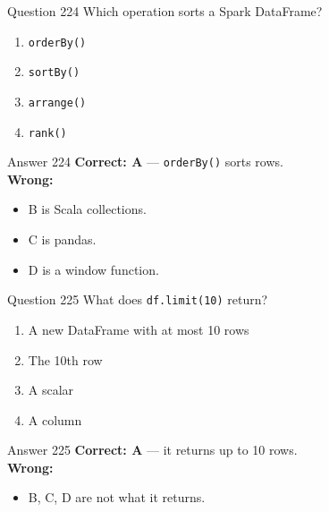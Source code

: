 \documentclass[aspectratio=169,11pt]{beamer}
\begin{document}
	\begin{frame}{Question 224}
		Which operation sorts a Spark DataFrame?
		\begin{enumerate}[label=\Alph*.]
			\item \texttt{orderBy()}
			\item \texttt{sortBy()}
			\item \texttt{arrange()}
			\item \texttt{rank()}
		\end{enumerate}
	\end{frame}
	\begin{frame}{Answer 224}
		\textbf{Correct: A} --- \texttt{orderBy()} sorts rows.\\
		\vspace{0.5em}
		\textbf{Wrong:}
		\begin{itemize}
			\item B is Scala collections.
			\item C is pandas.
			\item D is a window function.
		\end{itemize}
	\end{frame}
	
	\begin{frame}{Question 225}
		What does \texttt{df.limit(10)} return?
		\begin{enumerate}[label=\Alph*.]
			\item A new DataFrame with at most 10 rows
			\item The 10th row
			\item A scalar
			\item A column
		\end{enumerate}
	\end{frame}
	\begin{frame}{Answer 225}
		\textbf{Correct: A} --- it returns up to 10 rows.\\
		\vspace{0.5em}
		\textbf{Wrong:}
		\begin{itemize}
			\item B, C, D are not what it returns.
		\end{itemize}
	\end{frame}
	
\end{document}
